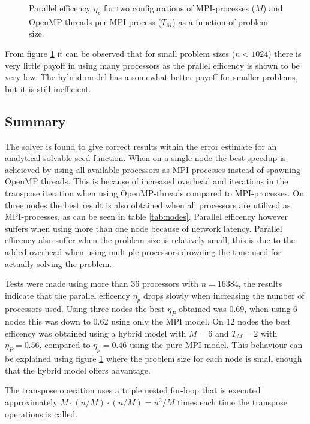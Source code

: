 \documentclass[11pt,a4paper,english]{article}
\numberwithin{figure}{subsection}
\numberwithin{table}{subsection}
\begin{document}
\begin{figure}[htbp]
	\centering
	
	\label{fig:peff}
	\caption{Parallel efficency $\eta_p$ for two configurations of MPI-processes ($M$) and OpenMP threads per MPI-process ($T_M$) as a function of problem size.}
\end{figure}

From figure \ref{fig:peff} it can be observed that for small problem sizes ($n<1024$) there is very little payoff in using many processors as the prallel efficency is shown to be very low. The hybrid model has a somewhat better payoff for smaller problems, but it is still inefficient.

\subsection{Summary}
The solver is found to give correct results within the error estimate for an analytical solvable seed function. When on a single node the best speedup is acheieved by using all available processors as MPI-processes instead of spawning OpenMP threads. This is because of increased overhead and iterations in the transpose iteration when using OpenMP-threads compared to MPI-processes. On three nodes the best result is also obtained when all processors are utilized as MPI-processes, as can be seen in table \ref{tab:nodes}. Parallel efficency however suffers when using more than one node because of network latency. Parallel efficency also suffer when the problem size is relatively small, this is due to the added overhead when using multiple processors drowning the time used for actually solving the problem.

Tests were made using more than 36 processors with $n=16384$, the results indicate that the parallel efficency $\eta_p$ drops slowly when increasing the number of processors used. Using three nodes the best $\eta_P$ obtained was 0.69, when using 6 nodes this was down to 0.62 using only the MPI model. On 12 nodes the best efficency was obtained using a hybrid model with $M=6$ and $T_M=2$ with $\eta_P=0.56$, compared to $\eta_p=0.46$ using the pure MPI model. This behaviour can be explained using figure \ref{fig:peff} where the problem size for each node is small enough that the hybrid model offers advantage.

The transpose operation uses a triple nested for-loop that is executed approximately $M\cdot (n/M)\cdot(n/M) = n^2/M$ times each time the transpose operations is called. 
\end{document}
